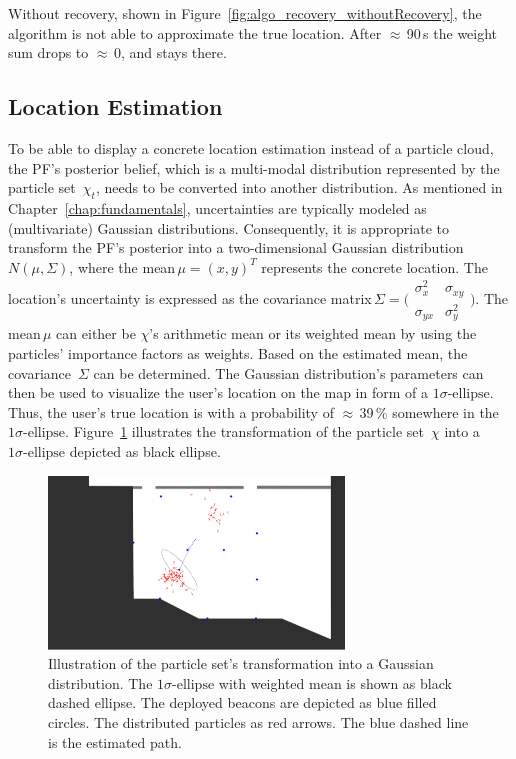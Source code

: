 Without recovery, shown in Figure~\ref{fig:algo_recovery_withoutRecovery}, the algorithm is not able to approximate the true location. After $\approx$\,90\,s the weight sum drops to $\approx$\,0, and stays there.


\subsection{Location Estimation}\label{sec:algo_locEstimation}
To be able to display a concrete location estimation instead of a particle cloud, the \acs{PF}'s posterior belief, which is a multi-modal distribution represented by the particle set~$\chi_t$, needs to be converted into another distribution. As mentioned in Chapter~\ref{chap:fundamentals}, uncertainties are typically modeled as (multivariate) Gaussian distributions. Consequently, it is appropriate to transform the \acs{PF}'s posterior into a two-dimensional Gaussian distribution~$N(\mu, \Sigma)$, where the mean\,$\mu = (x, y)^T$ represents the concrete location. The location's uncertainty is expressed as the covariance matrix\,$\Sigma = \bigl(\begin{smallmatrix} \sigma_{x}^2&\sigma_{xy}\\ \sigma_{yx}&\sigma_{y}^2 \end{smallmatrix} \bigr)$. The mean\,$\mu$ can either be $\chi$'s arithmetic mean or its weighted mean by using the particles' importance factors as weights. Based on the estimated mean, the covariance~$\Sigma$ can be determined. The Gaussian distribution's parameters can then be used to visualize the user's location on the map in form of a $1\sigma\text{-ellipse}$. Thus, the user's true location is with a probability of $\approx$\,39\,\% somewhere in the $1\sigma\text{-ellipse}$. Figure~\ref{fig:algo_sigellipse} illustrates the transformation of the particle set~$\chi$ into a  $1\sigma\text{-ellipse}$ depicted as black ellipse.

\begin{figure}
	\includegraphics[width=0.7\textwidth]{figures/sigellipse}
	\caption{Illustration of the particle set's transformation into a Gaussian distribution. The $1\sigma\text{-ellipse}$ with weighted mean is shown as black dashed ellipse. The deployed beacons are depicted as blue filled circles. The distributed particles as red arrows. The blue dashed line is the estimated path.}
	\label{fig:algo_sigellipse}
\end{figure}
